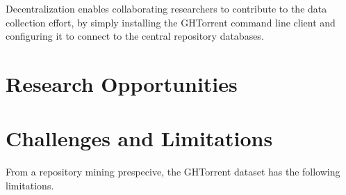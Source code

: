 \documentclass[conference]{IEEEtran}
\begin{document}
Decentralization enables collaborating researchers to contribute to the data
collection effort, by simply installing the GHTorrent command line client and
configuring it to connect to the central repository databases. 

\section{Research Opportunities}



\section{Challenges and Limitations}

From a repository mining prespecive, the GHTorrent dataset has the following
limitations. 
\end{document}
